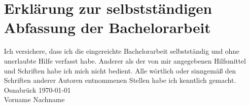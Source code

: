 \chapter*{Erklärung zur selbstständigen Abfassung der Bachelorarbeit}

Ich versichere, dass ich die eingereichte Bachelorarbeit selbstständig und ohne unerlaubte Hilfe verfasst habe. Anderer als der von mir angegebenen Hilfsmittel und Schriften habe ich mich nicht bedient. Alle wörtlich oder sinngemäß den Schriften anderer Autoren entnommenen Stellen habe ich kenntlich gemacht. \\


\bigskip
\bigskip
\bigskip
\bigskip
\noindent
Osnabrück \today\\

\bigskip
\bigskip
\bigskip
\bigskip
\noindent
Vorname Nachname